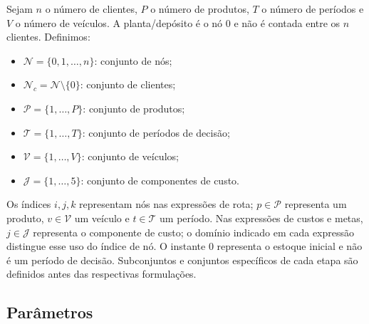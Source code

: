 \documentclass[11pt,a4paper]{article}
\newcommand{\N}{\mathcal{N}}
\newcommand{\Pset}{\mathcal{P}}
\newcommand{\Tset}{\mathcal{T}}
\newcommand{\Vset}{\mathcal{V}}
\begin{document}
Sejam $n$ o número de clientes, $P$ o número de produtos, $T$ o número de períodos e $V$ o número de veículos. A planta/depósito é o nó $0$ e não é contada entre os $n$ clientes. Definimos:
\begin{itemize}
    \item $\N=\{0,1,\ldots,n\}$: conjunto de nós;
    \item $\N_c=\N\setminus\{0\}$: conjunto de clientes;
    \item $\Pset=\{1,\ldots,P\}$: conjunto de produtos;
    \item $\Tset=\{1,\ldots,T\}$: conjunto de períodos de decisão;
    \item $\Vset=\{1,\ldots,V\}$: conjunto de veículos;
    \item $\mathcal J=\{1,\ldots,5\}$: conjunto de componentes de custo.
\end{itemize}
Os índices $i,j,k$ representam nós nas expressões de rota; $p\in\Pset$ representa um produto, $v\in\Vset$ um veículo e $t\in\Tset$ um período. Nas expressões de custos e metas, $j\in\mathcal J$ representa o componente de custo; o domínio indicado em cada expressão distingue esse uso do índice de nó. O instante $0$ representa o estoque inicial e não é um período de decisão. Subconjuntos e conjuntos específicos de cada etapa são definidos antes das respectivas formulações.

\subsection{Parâmetros}
\end{document}
